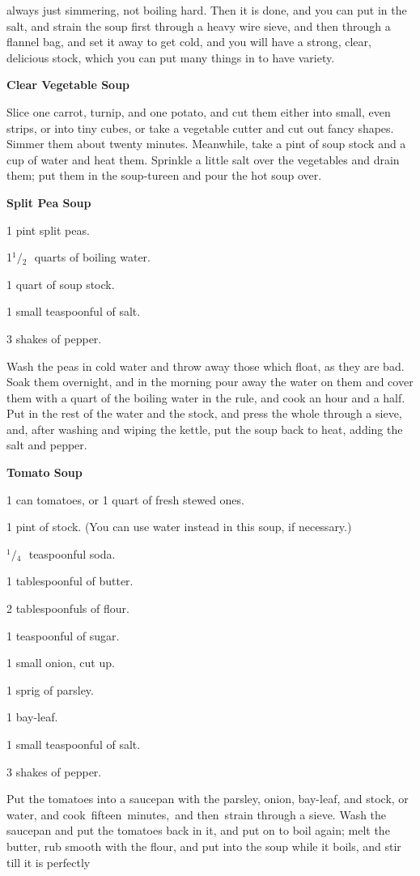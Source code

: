 \documentclass[11pt]{book}
\newcommand{\indpar}{\par\noindent\hspace*{\parindent}}
\newcommand{\ingredient}{\indpar}
\newcommand{\instruction}{\indpar}
\newcommand{\OneHalf}{\ensuremath{{}^1\!\!/\!{}_2\mbox{\ }}}
\newcommand{\OneQuarter}{\ensuremath{{}^1\!\!/\!{}_4\mbox{\ }}}
\newenvironment{RecipeTitle}{\medskip\begin{center}\large\bf }{\end{center}\smallskip}
\begin{document}
always just simmering, not boiling hard.  Then it is done, and
you can put in the salt, and strain the soup first through a
heavy wire sieve, and then through a flannel bag, and set it
away to get cold, and you will have a strong, clear, delicious
stock, which you can put many things in to have variety.
\begin{RecipeTitle}
Clear Vegetable Soup\label{clear_vegetable_soup}
\end{RecipeTitle}
\instruction  Slice one carrot, turnip, and one potato, and cut them either
into small, even strips, or into tiny cubes, or take a vegetable
cutter and cut out fancy shapes.  Simmer them about twenty
minutes.  Meanwhile, take a pint of soup stock and a cup of
water and heat them.  Sprinkle a little salt over the vegetables
and drain them; put them in the soup-tureen and pour the hot
soup over.
\begin{RecipeTitle}
Split Pea Soup\label{split_pea_soup}
\end{RecipeTitle}
\ingredient  1 pint split peas.
\ingredient  1\OneHalf quarts of boiling water.
\ingredient  1 quart of soup stock.
\ingredient  1 small teaspoonful of salt.
\ingredient  3 shakes of pepper.
\instruction  Wash the peas in cold water and throw away those which float,
as they are bad.  Soak them overnight, and in the morning
pour away the water on them and cover them with a quart of
the boiling water in the rule, and cook an hour and a half.
Put in the rest of the water and the stock, and press the
whole through a sieve, and, after washing and wiping the
kettle, put the soup back to heat, adding the salt and pepper.
\begin{RecipeTitle}
Tomato Soup\label{tomato_soup}
\end{RecipeTitle}
\ingredient  1 can tomatoes, or 1 quart of fresh stewed ones.
\ingredient  1 pint of stock.  (You can use water instead in this soup,
if necessary.)
\ingredient  \OneQuarter teaspoonful soda.
\ingredient  1 tablespoonful of butter.
\ingredient  2 tablespoonfuls of flour.
\ingredient  1 teaspoonful of sugar.
\ingredient  1 small onion, cut up.
\ingredient  1 sprig of parsley.
\ingredient  1 bay-leaf.
\ingredient  1 small teaspoonful of salt.
\ingredient  3 shakes of pepper.
\instruction  Put the tomatoes into a saucepan with the parsley, onion,
bay-leaf, and stock, or water, and cook\, fifteen\, minutes,\,
and then\, strain through a sieve.  Wash the saucepan and
put the tomatoes back in it, and put on to boil again;
melt the butter, rub smooth with the flour, and put into
the soup while it boils, and stir till it is perfectly
\end{document}
